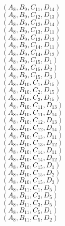 \documentclass[14pt]{article}
\begin{document}
    $({A}_{8}, {B}_{9}, {C}_{11}, {D}_{14}) $ \\ 
    $({A}_{8}, {B}_{9}, {C}_{12}, {D}_{13}) $ \\ 
    $({A}_{8}, {B}_{9}, {C}_{12}, {D}_{14}) $ \\ 
    $({A}_{8}, {B}_{9}, {C}_{13}, {D}_{11}) $ \\ 
    $({A}_{8}, {B}_{9}, {C}_{13}, {D}_{12}) $ \\ 
    $({A}_{8}, {B}_{9}, {C}_{14}, {D}_{11}) $ \\ 
    $({A}_{8}, {B}_{9}, {C}_{14}, {D}_{12}) $ \\ 
    $({A}_{8}, {B}_{9}, {C}_{15}, {D}_{1}) $ \\ 
    $({A}_{8}, {B}_{9}, {C}_{15}, {D}_{2}) $ \\ 
    $({A}_{8}, {B}_{9}, {C}_{15}, {D}_{3}) $ \\ 
    $({A}_{8}, {B}_{10}, {C}_{1}, {D}_{15}) $ \\ 
    $({A}_{8}, {B}_{10}, {C}_{2}, {D}_{15}) $ \\ 
    $({A}_{8}, {B}_{10}, {C}_{3}, {D}_{15}) $ \\ 
    $({A}_{8}, {B}_{10}, {C}_{11}, {D}_{13}) $ \\ 
    $({A}_{8}, {B}_{10}, {C}_{11}, {D}_{14}) $ \\ 
    $({A}_{8}, {B}_{10}, {C}_{12}, {D}_{13}) $ \\ 
    $({A}_{8}, {B}_{10}, {C}_{12}, {D}_{14}) $ \\ 
    $({A}_{8}, {B}_{10}, {C}_{13}, {D}_{11}) $ \\ 
    $({A}_{8}, {B}_{10}, {C}_{13}, {D}_{12}) $ \\ 
    $({A}_{8}, {B}_{10}, {C}_{14}, {D}_{11}) $ \\ 
    $({A}_{8}, {B}_{10}, {C}_{14}, {D}_{12}) $ \\ 
    $({A}_{8}, {B}_{10}, {C}_{15}, {D}_{1}) $ \\ 
    $({A}_{8}, {B}_{10}, {C}_{15}, {D}_{2}) $ \\ 
    $({A}_{8}, {B}_{10}, {C}_{15}, {D}_{3}) $ \\ 
    $({A}_{8}, {B}_{11}, {C}_{1}, {D}_{5}) $ \\ 
    $({A}_{8}, {B}_{11}, {C}_{2}, {D}_{5}) $ \\ 
    $({A}_{8}, {B}_{11}, {C}_{3}, {D}_{5}) $ \\ 
    $({A}_{8}, {B}_{11}, {C}_{5}, {D}_{1}) $ \\ 
    $({A}_{8}, {B}_{11}, {C}_{5}, {D}_{2}) $ \\ 
\end{document}
